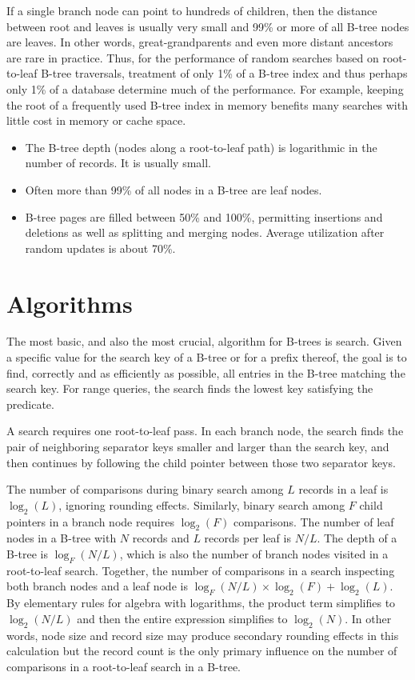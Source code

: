If a single branch node can point to hundreds of children, then the
distance between root and leaves is usually very small and 99\% or more
of all B-tree nodes are leaves. In other words, great-grandparents and
even more distant ancestors are rare in practice. Thus, for the
performance of random searches based on root-to-leaf B-tree traversals,
treatment of only 1\% of a B-tree index and thus perhaps only 1\% of a
database determine much of the performance. For example, keeping the
root of a frequently used B-tree index in memory benefits many searches
with little cost in memory or cache space.

\begin{itemize}
\item
  The B-tree depth (nodes along a root-to-leaf path) is logarithmic in
  the number of records. It is usually small.
\item
  Often more than 99\% of all nodes in a B-tree are leaf nodes.
\item
  B-tree pages are filled between 50\% and 100\%, permitting insertions
  and deletions as well as splitting and merging nodes. Average
  utilization after random updates is about 70\%.
\end{itemize}

\hypertarget{algorithms}{%
\section{Algorithms}\label{algorithms}}

The most basic, and also the most crucial, algorithm for B-trees is
search. Given a specific value for the search key of a B-tree or for a
prefix thereof, the goal is to find, correctly and as efficiently as
possible, all entries in the B-tree matching the search key. For range
queries, the search finds the lowest key satisfying the predicate.

A search requires one root-to-leaf pass. In each branch node, the search
finds the pair of neighboring separator keys smaller and larger than the
search key, and then continues by following the child pointer between
those two separator keys.

The number of comparisons during binary search among $L$ records in
a leaf is $\log_2(L)$, ignoring rounding effects.
Similarly, binary search among $F$ child pointers in a branch node
requires $\log_2(F)$ comparisons. The number of leaf
nodes in a B-tree with $N$ records and $L$ records per leaf is
$N/L$. The depth of a B-tree is
$\log_F(N/L)$, which is also the number of
branch nodes visited in a root-to-leaf search. Together, the number of
comparisons in a search inspecting both branch nodes and a leaf node is
$\log_F(N/L) \times \log_2(F)
+ \log_2(L)$. By elementary rules for algebra with
logarithms, the product term simplifies to
$\log_2(N/L)$ and then the entire expression
simplifies to $\log_2(N)$. In other words, node size
and record size may produce secondary rounding effects in this
calculation but the record count is the only primary influence on the
number of comparisons in a root-to-leaf search in a B-tree.

